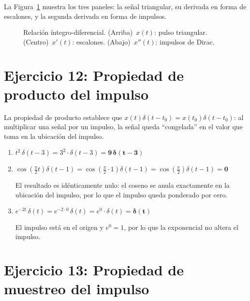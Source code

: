 \documentclass[10pt,a4paper]{article}
\begin{document}
	La Figura~\ref{fig:ejer7} muestra los tres paneles: la señal triangular, su derivada en forma de escalones, y la segunda derivada en forma de impulsos.
	
	\begin{figure}[H]
		\centering
		
		\caption{Relación íntegro-diferencial. (Arriba)~$x(t)$: pulso triangular. (Centro)~$x'(t)$: escalones. (Abajo)~$x''(t)$: impulsos de Dirac.}
		\label{fig:ejer7}
	\end{figure}

	\section*{Ejercicio 12: Propiedad de producto del impulso}
	
	La propiedad de producto establece que $x(t)\delta(t-t_0) = x(t_0)\delta(t-t_0)$: al multiplicar una señal por un impulso, la señal queda ``congelada'' en el valor que toma en la ubicación del impulso.
	
	\begin{enumerate}[label=\textbf{\alph*)}]
		\item $t^2\,\delta(t-3) = 3^2 \cdot \delta(t-3) = \mathbf{9\,\delta(t-3)}$
		
		\item $\cos\!\left(\frac{\pi}{2}t\right)\delta(t-1) = \cos\!\left(\frac{\pi}{2}\cdot 1\right)\delta(t-1) = \cos\!\left(\frac{\pi}{2}\right)\delta(t-1) = \mathbf{0}$
		
		El resultado es idénticamente nulo: el coseno se anula exactamente en la ubicación del impulso, por lo que el impulso queda ponderado por cero.
		
		\item $e^{-2t}\,\delta(t) = e^{-2\cdot 0}\,\delta(t) = e^0 \cdot \delta(t) = \mathbf{\delta(t)}$
		
		El impulso está en el origen y $e^0=1$, por lo que la exponencial no altera el impulso.
	\end{enumerate}

	\section*{Ejercicio 13: Propiedad de muestreo del impulso}
	
\end{document}
